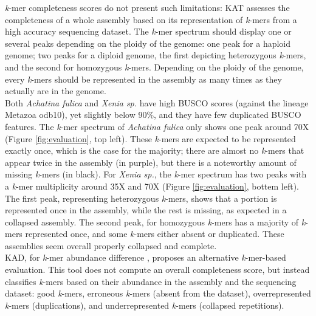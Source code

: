 \textit{k}-mer completeness scores do not present such limitations: KAT assesses the completeness of a whole assembly based on its representation of \textit{k}-mers from a high accuracy sequencing dataset. The \textit{k}-mer spectrum should display one or several peaks depending on the ploidy of the genome: one peak for a haploid genome; two peaks for a diploid genome, the first depicting heterozygous \textit{k}-mers, and the second for homozygous \textit{k}-mers. Depending on the ploidy of the genome, every \textit{k}-mers should be represented in the assembly as many times as they actually are in the genome. \\

Both \textit{Achatina fulica} and \textit{Xenia sp.} have high BUSCO scores (against the lineage Metazoa odb10), yet slightly below 90\%, and they have few duplicated BUSCO features. The \textit{k}-mer spectrum of \textit{Achatina fulica} only shows one peak around 70X (Figure \ref{fig:evaluation}, top left). These \textit{k}-mers are expected to be represented exactly once, which is the case for the majority; there are almost no \textit{k}-mers that appear twice in the assembly (in purple), but there is a noteworthy amount of missing \textit{k}-mers (in black). For \textit{Xenia sp.}, the \textit{k}-mer spectrum has two peaks with a \textit{k}-mer multiplicity around 35X and 70X (Figure \ref{fig:evaluation}, bottem left). The first peak, representing heterozygous \textit{k}-mers, shows that a portion is represented once in the assembly, while the rest is missing, as expected in a collapsed assembly. The second peak, for homozygous \textit{k}-mers has a majority of \textit{k}-mers represented once, and some \textit{k}-mers either absent or duplicated. These assemblies seem overall properly collapsed and complete. \\

KAD, for \textit{k}-mer abundance difference \cite{kad}, proposes an alternative \textit{k}-mer-based evaluation. This tool does not compute an overall completeness score, but instead classifies \textit{k}-mers based on their abundance in the assembly and the sequencing dataset: good \textit{k}-mers, erroneous \textit{k}-mers (absent from the dataset), overrepresented \textit{k}-mers (duplications), and underrepresented \textit{k}-mers (collapsed repetitions). \\


